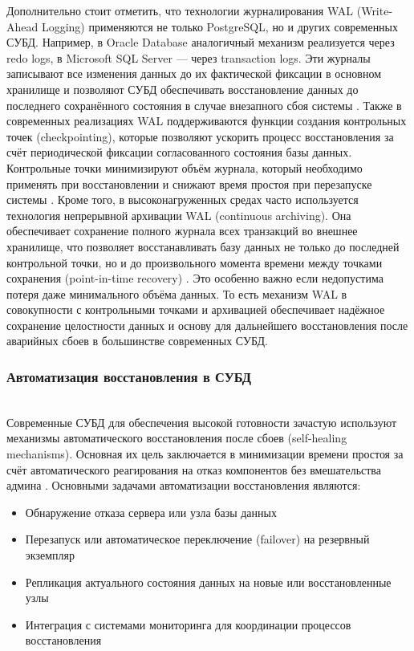 Дополнительно стоит отметить, что технологии журналирования WAL (Write-Ahead Logging) применяются не только PostgreSQL, но и других современных СУБД. Например, в Oracle Database аналогичный механизм реализуется через redo logs, в Microsoft SQL Server — через transaction logs. Эти журналы записывают все изменения данных до их фактической фиксации в основном хранилище и позволяют СУБД обеспечивать восстановление данных до последнего сохранённого состояния в случае внезапного сбоя системы \autocite{OszuValduriez}.
Также в современных реализациях WAL поддерживаются функции создания контрольных точек (checkpointing), которые позволяют ускорить процесс восстановления за счёт периодической фиксации согласованного состояния базы данных. Контрольные точки минимизируют объём журнала, который необходимо применять при восстановлении и снижают время простоя при перезапуске системы \autocite{GarciaMolina}.
Кроме того, в высоконагруженных средах часто используется технология непрерывной архивации WAL (continuous archiving). Она обеспечивает сохранение полного журнала всех транзакций во внешнее хранилище, что позволяет восстанавливать базу данных не только до последней контрольной точки, но и до произвольного момента времени между точками сохранения (point-in-time recovery) \autocite{Bernstein}. 
Это особенно важно если недопустима потеря даже минимального объёма данных.
То есть механизм WAL в совокупности с контрольными точками и архивацией обеспечивает надёжное сохранение целостности данных и основу для дальнейшего восстановления после аварийных сбоев в большинстве современных СУБД.


\subsubsection{Автоматизация восстановления в СУБД} ~\\

Современные СУБД для обеспечения высокой готовности зачастую используют механизмы автоматического восстановления после сбоев (self-healing mechanisms). Основная их цель заключается в минимизации времени простоя за счёт автоматического реагирования на отказ компонентов без вмешательства админа \autocite{SameerParadkar}.
Основными задачами автоматизации восстановления являются:
\begin{itemize}
    \item Обнаружение отказа сервера или узла базы данных
    \item Перезапуск или автоматическое переключение (failover) на резервный экземпляр
    \item Репликация актуального состояния данных на новые или восстановленные узлы
    \item Интеграция с системами мониторинга для координации процессов восстановления
\end{itemize}

